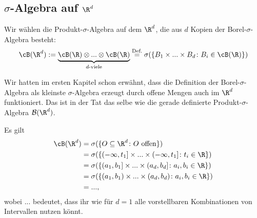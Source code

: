 \subsection*{$\sigma$-Algebra auf $\R^d$}

\begin{deff}
	Wir w\"ahlen die Produkt-$\sigma$-Algebra auf dem $\R^d$, die aus $d$ Kopien der Borel-$\sigma$-Algebra besteht:
	\[ \cB(\R^d) := \underbrace{\cB(\R) \otimes ... \otimes \cB(\R)}_{d\text{-viele}} \overset{\text{Def.}}{=} \sigma(\{ B_1 \times ... \times B_d \colon B_i \in \cB(\R) \}) \]
\end{deff}
Wir hatten im ersten Kapitel schon erw\"ahnt, dass die Definition der Borel-$\sigma$-Algebra als kleinste $\sigma$-Algebra erzeugt durch offene Mengen auch im $\R^d$ funktioniert. Das ist in der Tat das selbe wie die gerade definierte Produkt-$\sigma$-Algebra $\mathcal B(\R^d)$. 
\begin{lemma}
	Es gilt 
	\begin{align*}
		\cB(\R^d) &= \sigma(\{ O \subseteq \R^d\colon O \text{ offen} \})\\
		& = \sigma(\{ (-\infty,t_1] \times ... \times (-\infty,t_1] \colon t_i \in \R \})\\
		& = \sigma(\{ (a_1,b_1]\times ... \times (a_d,b_d] \colon a_i,b_i \in \R \})\\
		& = \sigma(\{ (a_1,b_1) \times ... \times (a_d,b_d) \colon a_i,b_i \in \R \})\\
		&=...,
	\end{align*}
	wobei ... bedeutet, dass ihr wie f\"ur $d=1$ alle vorstellbaren Kombinationen von Intervallen nutzen k\"onnt.	
\end{lemma}

